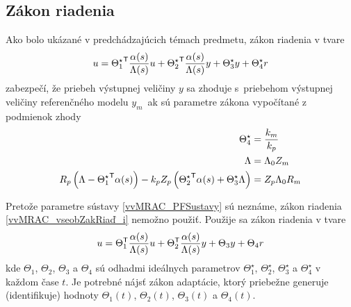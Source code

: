 ﻿\documentclass[a4paper, 10pt, ]{article}
\begin{document}
\subsection{Zákon riadenia}

Ako bolo ukázané v predchádzajúcich témach predmetu, zákon riadenia v tvare
\begin{equation} \label{vvMRAC_vseobZakRiaď_i}
	u = {\Theta_1^\star}^{\mathsf{T}} \frac{\alpha(s)}{\Lambda(s)} u + {\Theta_2^\star}^{\mathsf{T}} \frac{\alpha(s)}{\Lambda(s)} y + \Theta_3^\star y + \Theta_4^\star r
\end{equation}
zabezpečí, že priebeh výstupnej veličiny $y$ sa zhoduje s~priebehom výstupnej veličiny referenčného modelu $y_m$~ak sú parametre zákona vypočítané z podmienok zhody
\begin{subequations}
	\begin{align} \label{vvMRAC_idealTh4}
		\Theta_4^\star &= \frac{k_m}{k_p} \\
		\Lambda &= \Lambda_0 Z_m  \label{vvMRAC_idealLambda} \\
		R_p \left( \Lambda - {\Theta_1^\star}^{\mathsf{T}} \alpha(s) \right) -  k_p Z_p 	\left( {\Theta_2^\star}^{\mathsf{T}}  \alpha(s) +  \Theta_3^\star\Lambda	 \right) &= Z_p \Lambda_0 R_m
	\end{align}
\end{subequations}

Pretože parametre sústavy \eqref{vvMRAC_PFSustavy} sú neznáme, zákon riadenia \eqref{vvMRAC_vseobZakRiaď_i} nemožno použiť. Použije sa zákon riadenia v tvare
\begin{equation} \label{vvMRAC_vseobZakRiad}
	u = \Theta_1^{\mathsf{T}} \frac{\alpha(s)}{\Lambda(s)} u + \Theta_2^{\mathsf{T}} \frac{\alpha(s)}{\Lambda(s)} y + \Theta_3 y + \Theta_4 r
\end{equation}
kde $\Theta_1$, $\Theta_2$, $\Theta_3$ a $\Theta_4$ sú odhadmi ideálnych parametrov $\Theta_1^\star$, $\Theta_2^\star$, $\Theta_3^\star$ a $\Theta_4^\star$ v každom čase $t$. Je potrebné nájsť zákon adaptácie, ktorý priebežne generuje (identifikuje) hodnoty $\Theta_1(t)$, $\Theta_2(t)$, $\Theta_3(t)$ a $\Theta_4(t)$.
\end{document}
